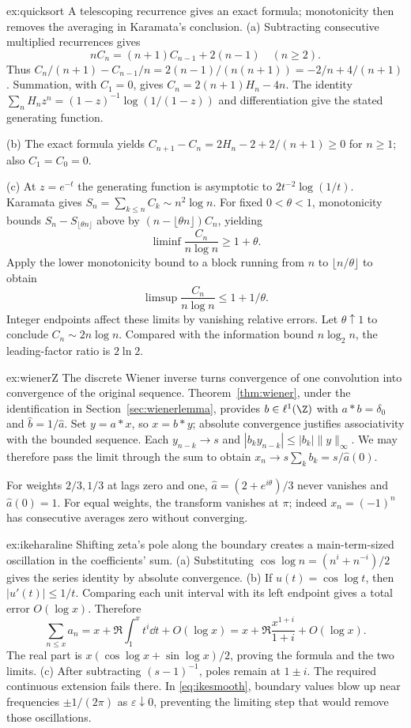 \begin{solution}{ex:quicksort}
\idea A telescoping recurrence gives an exact formula; monotonicity then removes the averaging in Karamata's conclusion.
\writeup (a) Subtracting consecutive multiplied recurrences gives
\[nC_n=(n+1)C_{n-1}+2(n-1)\quad(n\ge2).
\]
Thus $C_n/(n+1)-C_{n-1}/n=2(n-1)/(n(n+1))=-2/n+4/(n+1)$. Summation, with $C_1=0$, gives $C_n=2(n+1)H_n-4n$. The identity $\sum_nH_nz^n=(1-z)^{-1}\log(1/(1-z))$ and differentiation give the stated generating function.

(b) The exact formula yields $C_{n+1}-C_n=2H_n-2+2/(n+1)\ge0$ for $n\ge1$; also $C_1=C_0=0$.

(c) At $z=e^{-t}$ the generating function is asymptotic to $2t^{-2}\log(1/t)$. Karamata gives $S_n=\sum_{k\le n}C_k\sim n^2\log n$. For fixed $0<\theta<1$, monotonicity bounds $S_n-S_{\lfloor\theta n\rfloor}$ above by $(n-\lfloor\theta n\rfloor)C_n$, yielding
\[\liminf\frac{C_n}{n\log n}\ge1+\theta.
\]
Apply the lower monotonicity bound to a block running from $n$ to $\lfloor n/\theta\rfloor$ to obtain
\[\limsup\frac{C_n}{n\log n}\le1+1/\theta.
\]
Integer endpoints affect these limits by vanishing relative errors. Let $\theta\uparrow1$ to conclude $C_n\sim2n\log n$. Compared with the information bound $n\log_2n$, the leading-factor ratio is $2\ln2$.
\end{solution}
\begin{solution}{ex:wienerZ}
\idea The discrete Wiener inverse turns convergence of one convolution into convergence of the original sequence.
\writeup Theorem~\ref{thm:wiener}, under the identification in Section~\ref{sec:wienerlemma}, provides $b\in\ell^1(\Z)$ with $a*b=\delta_0$ and $\hat b=1/\hat a$. Set $y=a*x$, so $x=b*y$; absolute convergence justifies associativity with the bounded sequence. Each $y_{n-k}\to s$ and $|b_ky_{n-k}|\le|b_k|\|y\|_\infty$. We may therefore pass the limit through the sum to obtain $x_n\to s\sum_kb_k=s/\hat a(0)$.

For weights $2/3,1/3$ at lags zero and one, $\hat a=(2+e^{i\theta})/3$ never vanishes and $\hat a(0)=1$. For equal weights, the transform vanishes at $\pi$; indeed $x_n=(-1)^n$ has consecutive averages zero without converging.
\end{solution}
\begin{solution}{ex:ikeharaline}
\idea Shifting zeta's pole along the boundary creates a main-term-sized oscillation in the coefficients' sum.
\writeup (a) Substituting $\cos\log n=(n^i+n^{-i})/2$ gives the series identity by absolute convergence. (b) If $u(t)=\cos\log t$, then $|u'(t)|\le1/t$. Comparing each unit interval with its left endpoint gives a total error $O(\log x)$. Therefore
\[\sum_{n\le x}a_n=x+\Re\int_1^xt^i\dd t+O(\log x)
 =x+\Re\frac{x^{1+i}}{1+i}+O(\log x).
\]
The real part is $x(\cos\log x+\sin\log x)/2$, proving the formula and the two limits. (c) After subtracting $(s-1)^{-1}$, poles remain at $1\pm i$. The required continuous extension fails there. In \eqref{eq:ikesmooth}, boundary values blow up near frequencies $\pm1/(2\pi)$ as $\varepsilon\downarrow0$, preventing the limiting step that would remove those oscillations.
\end{solution}
